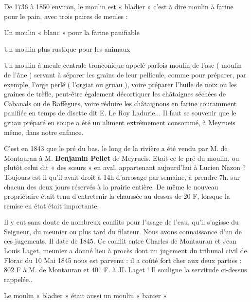 
De 1736 à 1850 environ, le moulin est « bladier » c’est à dire moulin à farine pour le pain,
avec trois paires de meules :

Un moulin « blanc » pour la farine panifiable

Un moulin plus rustique pour les animaux

Un moulin à meule centrale tronconique appelé parfois moulin de l’ase ( moulin de l’âne )
servant à séparer les grains de leur pellicule, comme pour préparer, par exemple, l’orge perlé
( l’orgiat ou gruau ), voire préparer l’huile de noix ou les graines de trèfle, peut-être
également décortiquer les châtaignes séchées de Cabanals ou de Raffègues, voire réduire les
châtaignons en farine couramment panifiée en temps de disette dit E. Le Roy Ladurie... Il
faut se souvenir que le gruau préparé en soupe a été un aliment extrêmement consommé, à
Meyrueis même, dans notre enfance.

\vspace{0.35cm}

C’est en 1843 que le pré du bas, le long de la rivière a été vendu par M. de Montauran à M.
\textbf{Benjamin Pellet} de Meyrueis. Etait-ce le pré du moulin, ou plutôt celui dit « des sœurs » en
aval, appartenant aujourd’hui à Lucien Nazon ? Toujours est-il qu’il avait droit à 14h
d’arrosage par semaine, à prendre 7h. sur chacun des deux jours réservés à la prairie entière.
De même le nouveau propriétaire était tenu d’entretenir la chaussée au dessus de 20 F, lorsque
la remise en état était importante.

\vspace{0.35cm}

Il y eut sans doute de nombreux conflits pour l’usage de l’eau, qu’il s’agisse du Seigneur, du
meunier ou plus tard du filateur. Nous avons connaissance d’un de ces jugements. Il date de
1845. Ce conflit entre Charles de Montauran et Jean Louis Laget, meunier a donné lieu à
procès dont un jugement du tribunal civil de Florac du 10 Mai 1845 nous est parvenu : il a
coûté fort cher aux deux parties : 802 F à M. de Montauran et 401 F. à JL Laget ! Il souligne
la servitude ci-dessus rappelée..

\vspace{0.35cm}

Le moulin « bladier » était aussi un moulin « banier »

